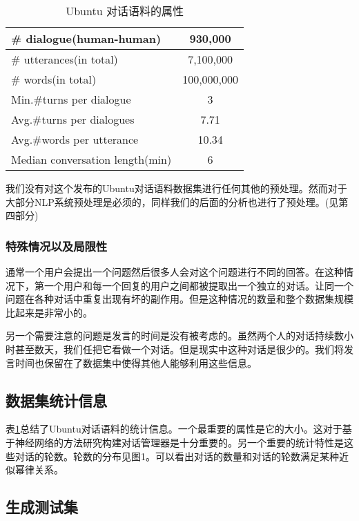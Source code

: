 \documentclass{article}
\begin{document}
\begin{multicols}{2}
		\begin{table}[H]
			\centering
			\begin{tabular}{|p{4cm}|c|}
				\hline
				\centering \# dialogue(human-human) & 930,000 \\
				\hline
				\centering \# utterances(in total) & 7,100,000\\
				\hline
				\centering	\# words(in total) & 100,000,000\\
				\hline
			\centering 	Min.\#turns per dialogue & 3 \\
				\hline
			\centering 	Avg.\#turns per dialogues & 7.71 \\
				\hline
			\centering 	Avg.\#words per utterance & 10.34 \\
				\hline
			\centering 	Median conversation length(min) & 6 \\
				\hline
			\end{tabular}
			\caption{Ubuntu 对话语料的属性}
			\label{数据集属性}
		\end{table}
		我们没有对这个发布的Ubuntu对话语料数据集进行任何其他的预处理。然而对于大部分NLP系统预处理是必须的，同样我们的后面的分析也进行了预处理。(见第四部分)
		
		\subsubsection{特殊情况以及局限性}
		
		通常一个用户会提出一个问题然后很多人会对这个问题进行不同的回答。在这种情况下，第一个用户和每一个回复的用户之间都被提取出一个独立的对话。让同一个问题在各种对话中重复出现有坏的副作用。但是这种情况的数量和整个数据集规模比起来是非常小的。
		
		另一个需要注意的问题是发言的时间是没有被考虑的。虽然两个人的对话持续数小时甚至数天，我们任把它看做一个对话。但是现实中这种对话是很少的。我们将发言时间也保留在了数据集中使得其他人能够利用这些信息。
		
		\subsection{数据集统计信息}
		
		表\ref{数据集属性}总结了Ubuntu对话语料的统计信息。一个最重要的属性是它的大小。这对于基于神经网络的方法研究构建对话管理器是十分重要的。另一个重要的统计特性是这些对话的轮数。轮数的分布见图1。可以看出对话的数量和对话的轮数满足某种近似幂律关系。
		
		\subsection{生成测试集}
		

\end{multicols}
\end{document}
